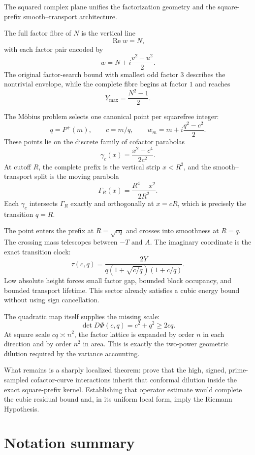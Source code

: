 \documentclass[11pt]{article}
\theoremstyle{definition}
\theoremstyle{remark}
\newcommand{\Pplus}{P^{+}}
\newcommand{\1}{\mathbf{1}}
\newcommand{\Repart}{\operatorname{Re}}
\begin{document}
The squared complex plane unifies the factorization geometry and the square-prefix smooth--transport architecture.

The full factor fibre of $N$ is the vertical line
\[
 \Repart w=N,
\]
with each factor pair encoded by
\[
 w=N+i\frac{v^2-u^2}{2}.
\]
The original factor-search bound with smallest odd factor $3$ describes the nontrivial envelope, while the complete fibre begins at factor $1$ and reaches
\[
 Y_{\max}=\frac{N^2-1}{2}.
\]

The M\"obius problem selects one canonical point per squarefree integer:
\[
 q=\Pplus(m),
 \qquad
 c=m/q,
 \qquad
 w_m=m+i\frac{q^2-c^2}{2}.
\]
These points lie on the discrete family of cofactor parabolas
\[
 \gamma_c(x)=\frac{x^2-c^4}{2c^2}.
\]
At cutoff $R$, the complete prefix is the vertical strip $x<R^2$, and the smooth--transport split is the moving parabola
\[
 \Gamma_R(x)=\frac{R^4-x^2}{2R^2}.
\]
Each $\gamma_c$ intersects $\Gamma_R$ exactly and orthogonally at $x=cR$, which is precisely the transition $q=R$.

The point enters the prefix at $R=\sqrt{cq}$ and crosses into smoothness at $R=q$.  The crossing mass telescopes between $-T$ and $A$.  The imaginary coordinate is the exact transition clock:
\[
 \tau(c,q)
 =
 \frac{2Y}
 {q(1+\sqrt{c/q})(1+c/q)}.
\]
Low absolute height forces small factor gap, bounded block occupancy, and bounded transport lifetime.  This sector already satisfies a cubic energy bound without using sign cancellation.

The quadratic map itself supplies the missing scale:
\[
 \det D\Phi(c,q)=c^2+q^2\ge2cq.
\]
At square scale $cq\asymp n^2$, the factor lattice is expanded by order $n$ in each direction and by order $n^2$ in area.  This is exactly the two-power geometric dilution required by the variance accounting.

What remains is a sharply localized theorem: prove that the high, signed, prime-sampled cofactor-curve interactions inherit that conformal dilution inside the exact square-prefix kernel.  Establishing that operator estimate would complete the cubic residual bound and, in its uniform local form, imply the Riemann Hypothesis.

\appendix
\section{Notation summary}
\end{document}
